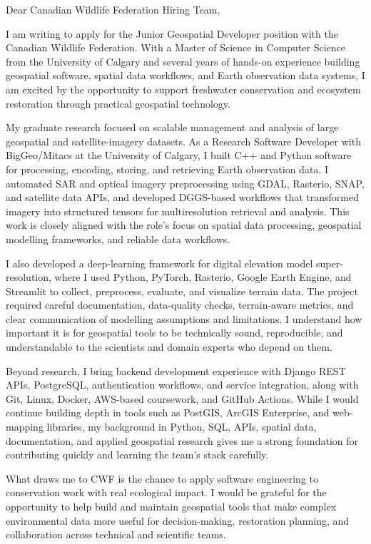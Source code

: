 \documentclass[11pt]{letter}
\begin{document}
\begin{letter}{}

\opening{Dear Canadian Wildlife Federation Hiring Team,}

I am writing to apply for the Junior Geospatial Developer position with the Canadian Wildlife Federation. With a Master of Science in Computer Science from the University of Calgary and several years of hands-on experience building geospatial software, spatial data workflows, and Earth observation data systems, I am excited by the opportunity to support freshwater conservation and ecosystem restoration through practical geospatial technology.

My graduate research focused on scalable management and analysis of large geospatial and satellite-imagery datasets. As a Research Software Developer with BigGeo/Mitacs at the University of Calgary, I built C++ and Python software for processing, encoding, storing, and retrieving Earth observation data. I automated SAR and optical imagery preprocessing using GDAL, Rasterio, SNAP, and satellite data APIs, and developed DGGS-based workflows that transformed imagery into structured tensors for multiresolution retrieval and analysis. This work is closely aligned with the role's focus on spatial data processing, geospatial modelling frameworks, and reliable data workflows.

I also developed a deep-learning framework for digital elevation model super-resolution, where I used Python, PyTorch, Rasterio, Google Earth Engine, and Streamlit to collect, preprocess, evaluate, and visualize terrain data. The project required careful documentation, data-quality checks, terrain-aware metrics, and clear communication of modelling assumptions and limitations. I understand how important it is for geospatial tools to be technically sound, reproducible, and understandable to the scientists and domain experts who depend on them.

Beyond research, I bring backend development experience with Django REST APIs, PostgreSQL, authentication workflows, and service integration, along with Git, Linux, Docker, AWS-based coursework, and GitHub Actions. While I would continue building depth in tools such as PostGIS, ArcGIS Enterprise, and web-mapping libraries, my background in Python, SQL, APIs, spatial data, documentation, and applied geospatial research gives me a strong foundation for contributing quickly and learning the team's stack carefully.

What draws me to CWF is the chance to apply software engineering to conservation work with real ecological impact. I would be grateful for the opportunity to help build and maintain geospatial tools that make complex environmental data more useful for decision-making, restoration planning, and collaboration across technical and scientific teams.


\end{letter}
\end{document}
